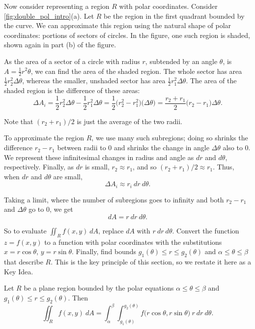 Now consider representing a region $R$ with polar coordinates. Consider \autoref{fig:double_pol_intro}(a). Let $R$ be the region in the first quadrant bounded by the curve. We can approximate this region using the natural shape of polar coordinates: portions of sectors of circles. In the figure, one such region is shaded, shown again in part (b) of the figure.

As the area of a sector of a circle with radius $r$, subtended by an angle $\theta$, is $A = \frac12r^2\theta$, we can find the area of the shaded region. The whole sector has area $\frac12r_2^2\Delta \theta$, whereas the smaller, unshaded sector has area $\frac12r_1^2\Delta \theta$. The area of the shaded region is the difference of these areas:
\[\Delta A_i = \frac12r_2^2\Delta\theta-\frac12r_1^2\Delta\theta = \frac12\big(r_2^2-r_1^2\big)\big(\Delta\theta\big) = \frac{r_2+r_1}{2}\big(r_2-r_1\big)\Delta\theta.\]

Note that $(r_2+r_1)/2$ is just the average of the two radii. 

To approximate the region $R$, we use many such subregions; doing so shrinks the difference $r_2-r_1$ between radii to 0 and shrinks the change in angle $\Delta \theta$ also to 0. We represent these infinitesimal changes in radius and angle as $dr$ and $d\theta$, respectively. Finally, as $dr$ is small, $r_2\approx r_1$, and so $(r_2+r_1)/2\approx r_1$. Thus, when $dr$ and $d\theta$ are small, 
\[\Delta A_i \approx r_i\ dr\ d\theta.\]

Taking a limit, where the number of subregions goes to infinity and both $r_2-r_1$ and $\Delta\theta$ go to 0, we get \[dA = r\ dr\ d\theta.\]

So to evaluate $\iint_Rf(x,y)\ dA$, replace $dA$ with $r\ dr\ d\theta$. Convert the function $z=f(x,y)$ to a function with polar coordinates with the substitutions $x=r\cos\theta$, $y=r\sin\theta$. Finally, find bounds $g_1(\theta)\leq r\leq g_2(\theta)$ and $\alpha\leq\theta\leq\beta$ that describe $R$. This is the key principle of this section, so we restate it here as a Key Idea.

\begin{keyidea}\label{idea:doublepol}
Let $R$ be a plane region bounded by the polar equations $\alpha\leq\theta\leq\beta$ and  $g_1(\theta)\leq r\leq g_2(\theta)$. Then
\[\iint_Rf(x,y)\ dA = \int_\alpha^\beta\int_{g_1(\theta)}^{g_2(\theta)} f\big(r\cos\theta,r\sin\theta\big)\ r\ dr\ d\theta.\]
\end{keyidea}

